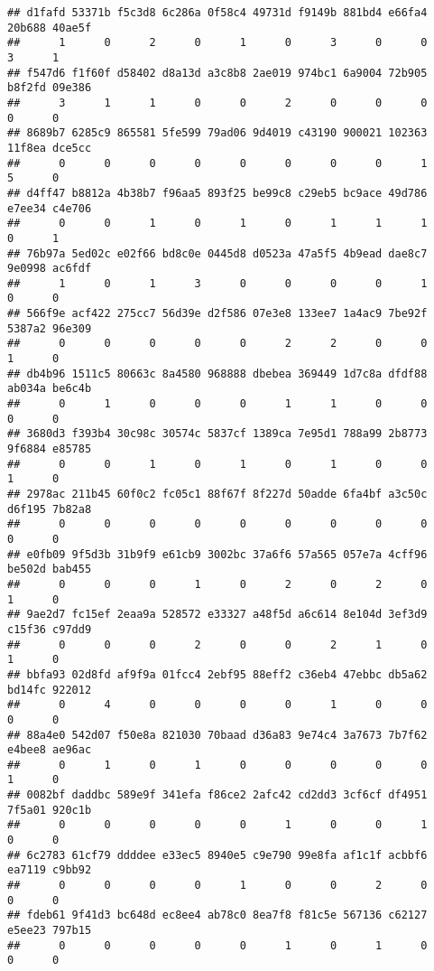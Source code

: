 \documentclass[
]{article}
\begin{document}
\begin{verbatim}
## d1fafd 53371b f5c3d8 6c286a 0f58c4 49731d f9149b 881bd4 e66fa4 20b688 40ae5f 
##      1      0      2      0      1      0      3      0      0      3      1 
## f547d6 f1f60f d58402 d8a13d a3c8b8 2ae019 974bc1 6a9004 72b905 b8f2fd 09e386 
##      3      1      1      0      0      2      0      0      0      0      0 
## 8689b7 6285c9 865581 5fe599 79ad06 9d4019 c43190 900021 102363 11f8ea dce5cc 
##      0      0      0      0      0      0      0      0      1      5      0 
## d4ff47 b8812a 4b38b7 f96aa5 893f25 be99c8 c29eb5 bc9ace 49d786 e7ee34 c4e706 
##      0      0      1      0      1      0      1      1      1      0      1 
## 76b97a 5ed02c e02f66 bd8c0e 0445d8 d0523a 47a5f5 4b9ead dae8c7 9e0998 ac6fdf 
##      1      0      1      3      0      0      0      0      1      0      0 
## 566f9e acf422 275cc7 56d39e d2f586 07e3e8 133ee7 1a4ac9 7be92f 5387a2 96e309 
##      0      0      0      0      0      2      2      0      0      1      0 
## db4b96 1511c5 80663c 8a4580 968888 dbebea 369449 1d7c8a dfdf88 ab034a be6c4b 
##      0      1      0      0      0      1      1      0      0      0      0 
## 3680d3 f393b4 30c98c 30574c 5837cf 1389ca 7e95d1 788a99 2b8773 9f6884 e85785 
##      0      0      1      0      1      0      1      0      0      1      0 
## 2978ac 211b45 60f0c2 fc05c1 88f67f 8f227d 50adde 6fa4bf a3c50c d6f195 7b82a8 
##      0      0      0      0      0      0      0      0      0      0      0 
## e0fb09 9f5d3b 31b9f9 e61cb9 3002bc 37a6f6 57a565 057e7a 4cff96 be502d bab455 
##      0      0      0      1      0      2      0      2      0      1      0 
## 9ae2d7 fc15ef 2eaa9a 528572 e33327 a48f5d a6c614 8e104d 3ef3d9 c15f36 c97dd9 
##      0      0      0      2      0      0      2      1      0      1      0 
## bbfa93 02d8fd af9f9a 01fcc4 2ebf95 88eff2 c36eb4 47ebbc db5a62 bd14fc 922012 
##      0      4      0      0      0      0      1      0      0      0      0 
## 88a4e0 542d07 f50e8a 821030 70baad d36a83 9e74c4 3a7673 7b7f62 e4bee8 ae96ac 
##      0      1      0      1      0      0      0      0      0      1      0 
## 0082bf daddbc 589e9f 341efa f86ce2 2afc42 cd2dd3 3cf6cf df4951 7f5a01 920c1b 
##      0      0      0      0      0      1      0      0      1      0      0 
## 6c2783 61cf79 ddddee e33ec5 8940e5 c9e790 99e8fa af1c1f acbbf6 ea7119 c9bb92 
##      0      0      0      0      1      0      0      2      0      0      0 
## fdeb61 9f41d3 bc648d ec8ee4 ab78c0 8ea7f8 f81c5e 567136 c62127 e5ee23 797b15 
##      0      0      0      0      0      1      0      1      0      0      0 

\end{verbatim}
\end{document}

